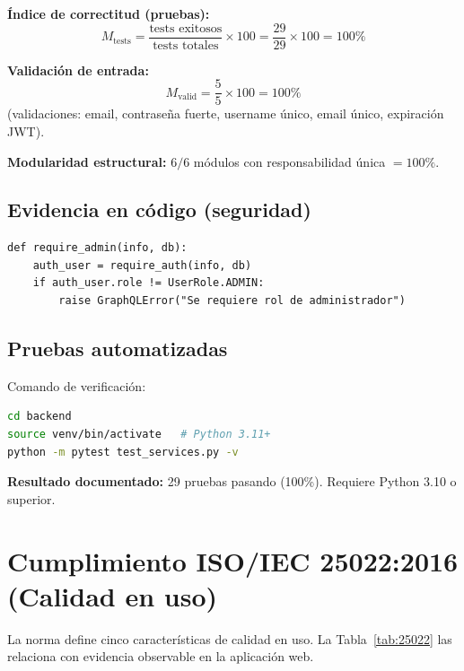 \documentclass[11pt,a4paper]{article}
\begin{document}
\textbf{Índice de correctitud (pruebas):}
\begin{equation}
  M_{\text{tests}} = \frac{\text{tests exitosos}}{\text{tests totales}} \times 100 = \frac{29}{29} \times 100 = 100\%
\end{equation}

\textbf{Validación de entrada:}
\begin{equation}
  M_{\text{valid}} = \frac{5}{5} \times 100 = 100\%
\end{equation}
(validaciones: email, contraseña fuerte, username único, email único, expiración JWT).

\textbf{Modularidad estructural:} $6/6$ módulos con responsabilidad única $= 100\%$.

\subsection{Evidencia en código (seguridad)}
\begin{lstlisting}
def require_admin(info, db):
    auth_user = require_auth(info, db)
    if auth_user.role != UserRole.ADMIN:
        raise GraphQLError("Se requiere rol de administrador")
\end{lstlisting}

\subsection{Pruebas automatizadas}
Comando de verificación:
\begin{lstlisting}[language=bash]
cd backend
source venv/bin/activate   # Python 3.11+
python -m pytest test_services.py -v
\end{lstlisting}
\textbf{Resultado documentado:} 29 pruebas pasando (100\%). Requiere Python 3.10 o superior.

\section{Cumplimiento ISO/IEC 25022:2016 (Calidad en uso)}

La norma define cinco características de calidad en uso. La Tabla~\ref{tab:25022} las relaciona con evidencia observable en la aplicación web.
\end{document}
